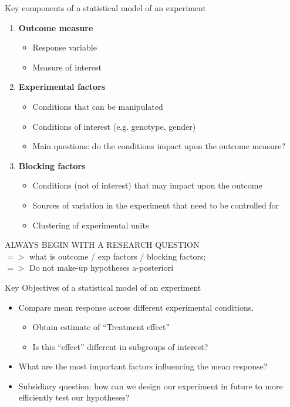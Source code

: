 \documentclass[10pt]{beamer}
\begin{document}
\begin{frame}{Key components of a statistical model of an experiment}
 \begin{enumerate}
\item \textbf{Outcome measure}
  \begin{itemize}
    \item Response variable
    \item Measure of interest
  \end{itemize}
\item \textbf{Experimental factors}
  \begin{itemize}
    \item Conditions that can be manipulated 
    \item Conditions of interest (e.g. genotype, gender) 
    \item Main questions: do the conditions impact upon the outcome measure?
  \end{itemize}
\item \textbf{Blocking factors}
  \begin{itemize}
    \item Conditions (not of interest) that may impact upon the outcome
    \item Sources of variation in the experiment that need to be controlled for
    \item Clustering of experimental units
 \end{itemize}
\end{enumerate}
\pause
  \alert{ALWAYS BEGIN WITH A RESEARCH QUESTION}\\
  $=>$ what is outcome / exp factors / blocking factors; \\
  $=>$ Do not make-up hypotheses a-posteriori

\end{frame}

\begin{frame}{Key Objectives of a statistical model of an experiment}

\begin{itemize}
 \item Compare mean response across different experimental conditions.
  \begin{itemize}
   \item Obtain estimate of “Treatment effect”
   \item Is this “effect” different in subgroups of interest?
  \end{itemize}
 \item What are the most important factors influencing the mean response? 
 \item Subsidiary question: how can we design our experiment in future to more efficiently test our hypotheses?
\end{itemize}


\end{frame}
\end{document}
